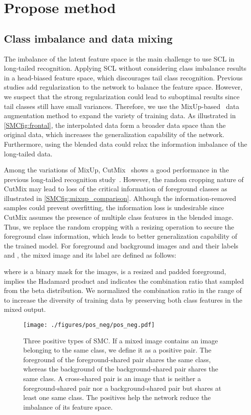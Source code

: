 \documentclass[10pt,twocolumn,letterpaper]{article}
\begin{document}
\section{Propose method}
\label{SMCsec:method}

\subsection{Class imbalance and data mixing}
The imbalance of the latent feature space is the main challenge to use SCL in long-tailed recognition. Applying SCL without considering class imbalance results in a head-biased feature space, which discourages tail class recognition. Previous studies add regularization to the network to balance the feature space.
However, we suspect that the strong regularization could lead to suboptimal results since tail classes still have small variances.
Therefore, we use the MixUp-based~\cite{MixUp} data augmentation method to expand the variety of training data. As illustrated in \cref{SMCfig:frontal}, the interpolated data form a broader data space than the original data, which increases the generalization capability of the network. Furthermore, using the blended data could relax the information imbalance of the long-tailed data.

Among the variations of MixUp, CutMix~\cite{CutMix} shows a good performance in the previous long-tailed recognition study~\cite{CMO}.
However, the random cropping nature of CutMix may lead to loss of the critical information of foreground classes as illustrated in \cref{SMCfig:mixup_comparison}.
Although the information-removed samples could prevent overfitting, the information loss is undesirable since CutMix assumes the presence of multiple class features in the blended image.
Thus, we replace the random cropping with a resizing operation to secure the foreground class information, which leads to better generalization capability of the trained model.
For foreground and background images  and  and their labels  and , the mixed image  and its label  are defined as follows:

where  is a binary mask for the images,  is a resized and padded foreground,  implies the Hadamard product and  indicates the combination ratio that sampled from the beta distribution.
We normalized the combination ratio in the range of  to increase the diversity of training data by preserving both class features in the mixed output.

\begin{figure*}[t]
    \centering
    \texttt{[image: ./figures/pos\_neg/pos\_neg.pdf]}
    \caption{Three positive types of SMC.
    If a mixed image contains an image belonging to the same class, we define it as a positive pair.
    The foreground of the foreground-shared pair shares the same class, whereas the background of the background-shared pair shares the same class. A cross-shared pair is an image that is neither a foreground-shared pair nor a background-shared pair but shares at least one same class. The positives help the network reduce the imbalance of its feature space.}
    \label{SMCfig:pos_neg_definition}
\end{figure*}
\end{document}
